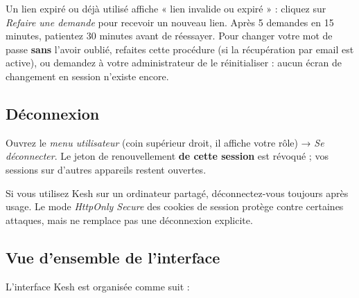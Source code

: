 \documentclass[a4paper,11pt,oneside]{article}
\begin{document}
\begin{keshtip}
Un lien expiré ou déjà utilisé affiche « lien invalide ou expiré » : cliquez sur \emph{Refaire une demande} pour recevoir un nouveau lien. Après 5 demandes en 15 minutes, patientez 30 minutes avant de réessayer. Pour changer votre mot de passe \textbf{sans} l'avoir oublié, refaites cette procédure (si la récupération par email est active), ou demandez à votre administrateur de le réinitialiser : aucun écran de changement en session n'existe encore.
\end{keshtip}

\subsection{Déconnexion}

Ouvrez le \emph{menu utilisateur} (coin supérieur droit, il affiche votre rôle) → \emph{Se déconnecter}. Le jeton de renouvellement \textbf{de cette session} est révoqué ; vos sessions sur d'autres appareils restent ouvertes.

\begin{keshtip}
Si vous utilisez Kesh sur un ordinateur partagé, déconnectez-vous toujours après usage. Le mode \emph{HttpOnly Secure} des cookies de session protège contre certaines attaques, mais ne remplace pas une déconnexion explicite.
\end{keshtip}

\subsection{Vue d'ensemble de l'interface}

L'interface Kesh est organisée comme suit :
\end{document}
